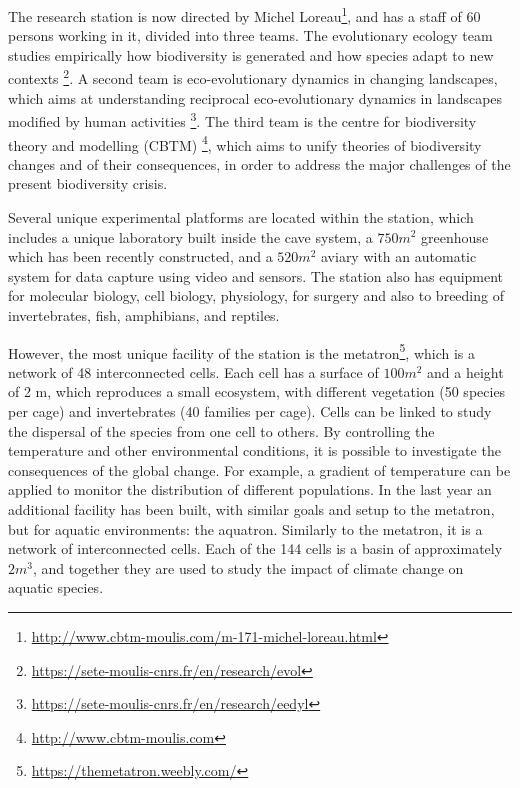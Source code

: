 \documentclass{article}
\begin{document}
The research station is now directed by Michel Loreau\footnote{\url{http://www.cbtm-moulis.com/m-171-michel-loreau.html}}, and has a staff of 60 persons working in it, divided into three teams.
The evolutionary ecology team studies empirically how biodiversity is generated and how species adapt to new contexts \footnote{\url{https://sete-moulis-cnrs.fr/en/research/evol}}. A second team is eco-evolutionary dynamics in changing landscapes, which aims at understanding reciprocal eco-evolutionary dynamics in landscapes modified by human activities \footnote{\url{https://sete-moulis-cnrs.fr/en/research/eedyl}}. The third team is the centre for biodiversity theory and modelling (CBTM) \footnote{\url{http://www.cbtm-moulis.com}}, which aims to unify theories of biodiversity changes and of their consequences, in order to address the major challenges of the present biodiversity crisis.

Several unique experimental platforms are located within the station, which includes a unique laboratory built inside the cave system, a $750m^2$ greenhouse which has been recently constructed, and a $520m^2$ aviary with an automatic system for data capture using video and sensors. The station also has equipment for molecular biology, cell biology, physiology, for surgery and also to breeding of invertebrates, fish, amphibians, and reptiles. 

However, the most unique facility of the station is the metatron\footnote{\url{https://themetatron.weebly.com/}}, which is a network of 48 interconnected cells. Each cell has a surface of $100m^2$ and a height of 2 m, which reproduces a small ecosystem, with different vegetation (50 species per cage) and invertebrates (40 families per cage). Cells can be linked to study the dispersal of the species from one cell to others. By controlling the temperature and other environmental conditions, it is possible to investigate the consequences of the global change. For example, a gradient of temperature can be applied to monitor the distribution of different populations. In the last year an additional facility has been built, with similar goals and setup to the metatron, but for aquatic environments: the aquatron. Similarly to the metatron, it is a network of interconnected cells. Each of the 144 cells is a basin of approximately $2m^3$, and together they are used to study the impact of climate change on aquatic species.
\end{document}
